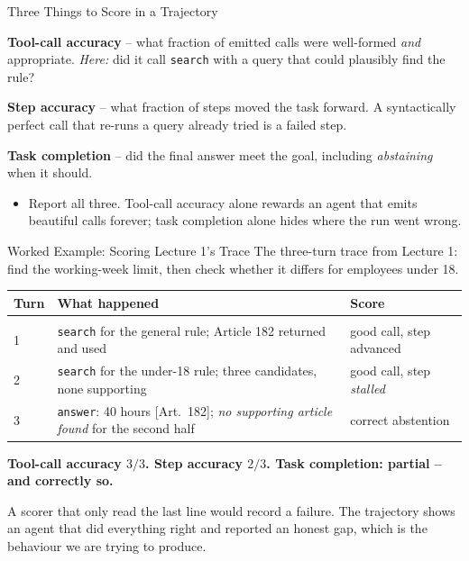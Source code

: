 \begin{frame}{Three Things to Score in a Trajectory}
\begin{rldefinition}
\textbf{Tool-call accuracy} -- what fraction of emitted calls were well-formed \emph{and} appropriate. \emph{Here:} did it call \texttt{search} with a query that could plausibly find the rule?

\smallskip
\textbf{Step accuracy} -- what fraction of steps moved the task forward. A syntactically perfect call that re-runs a query already tried is a failed step.

\smallskip
\textbf{Task completion} -- did the final answer meet the goal, including \emph{abstaining} when it should.
\end{rldefinition}
\pause
\begin{itemize}
  \item Report all three. Tool-call accuracy alone rewards an agent that emits beautiful calls forever; task completion alone hides where the run went wrong.
\end{itemize}
\end{frame}

\begin{frame}{Worked Example: Scoring Lecture 1's Trace}
\footnotesize
The three-turn trace from Lecture 1: find the working-week limit, then check whether it differs for employees under 18.
\smallskip

\scriptsize
\begin{tabular}{@{}p{}p{}p{}@{}}
\textbf{Turn} & \textbf{What happened} & \textbf{Score} \\[3pt]
\hline\\[-6pt]
1 & \texttt{search} for the general rule; Article 182 returned and used & good call, step advanced \\[4pt]
2 & \texttt{search} for the under-18 rule; three candidates, none supporting & good call, step \emph{stalled} \\[4pt]
3 & \texttt{answer}: 40 hours [Art.~182]; \emph{no supporting article found} for the second half & correct abstention \\
\end{tabular}
\pause

\smallskip
\footnotesize
\textbf{Tool-call accuracy $3/3$. Step accuracy $2/3$. Task completion: partial -- and correctly so.}

\pause
A scorer that only read the last line would record a failure. The trajectory shows an agent that did everything right and reported an honest gap, which is the behaviour we are trying to produce.
\end{frame}

